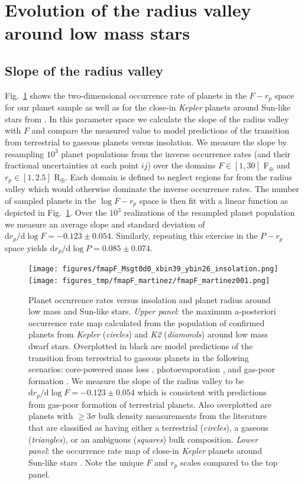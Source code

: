 \documentclass[twocolumn]{emulateapj}
\newcommand{\kepler}[1]{\emph{Kepler}#1}
\newcommand{\ktwo}[1]{\emph{K2}#1}
\begin{document}
\section{Evolution of the radius valley around low mass stars} \label{sect:models}
\subsection{Slope of the radius valley}
Fig.~\ref{fig:fmapF} shows the two-dimensional occurrence rate of planets in the $F-r_p$ space for
our planet sample as well as for the close-in \kepler{} planets around Sun-like stars
from \cite{martinez19}.
In this parameter space we calculate the slope of the radius valley with $F$ and compare the measured
value to model predictions of the transition from terrestrial to gaseous planets
versus insolation. We measure the slope by resampling $10^3$ planet populations from the inverse
occurrence rates (and their fractional uncertainties at each point $ij$) over the domains
$F\in [1,30]$ F$_{\oplus}$ and $r_p\in [1,2.5]$ R$_{\oplus}$.
Each domain is defined to neglect regions far from the radius valley which would otherwise dominate the
inverse occurrence rates. The number of sampled planets in the $\log{F}-r_p$ space is then fit with a
linear function as depicted in Fig.~\ref{fig:fmapF}. Over the $10^3$ realizations of the resampled planet
population we measure an average slope and standard deviation of
$\text{d}r_p / \text{d}\log{F} = -0.123\pm 0.054$. Similarly, repeating this exercise in the $P-r_p$
space yields $\text{d}r_p / \text{d}\log{P} = 0.085\pm 0.074$.

\begin{figure}
  \centering %
  \texttt{[image: figures/fmapF\_Msgt0d0\_xbin39\_ybin26\_insolation.png]}
  \texttt{[image: figures\_tmp/fmapF\_martinez/fmapF\_martinez001.png]}
  \caption{Planet occurrence rates versus insolation and planet radius around low mass and Sun-like stars.
    \emph{Upper panel}: the maximum a-posteriori occurrence
    rate map calculated from the population of confirmed planets from \kepler{} (\emph{circles}) and
    \ktwo{} (\emph{diamonds}) around low mass dwarf
    stars. Overplotted in black are model predictions of the transition from terrestrial to gaseous
    planets in the following scenarios: core-powered mass loss \citep{gupta19b}, photoevaporation
    \citep{lopez18}, and gas-poor formation \cite{lopez18}. We measure the slope of the radius valley
    to be $\text{d}r_p / \text{d}\log{F} = -0.123\pm 0.054$ which is consistent with predictions
    from gas-poor formation of terrestrial planets. Also overplotted are planets
    with $\geq 3\sigma$ bulk density measurements from the literature that are classified as having either
    a terrestrial (\emph{circles}), a gaseous (\emph{triangles}), or an ambiguous (\emph{squares}) bulk
    composition. \emph{Lower panel}: the occurrence rate map of close-in
    \kepler{} planets around Sun-like stars \citep[$\text{d}\log{r_p}/\text{d}\log{F} = 0.12\pm 0.02$][]{martinez19}.
    Note the unique $F$ and $r_p$ scales compared to the top panel.}
  \label{fig:fmapF}
\end{figure}
\end{document}
